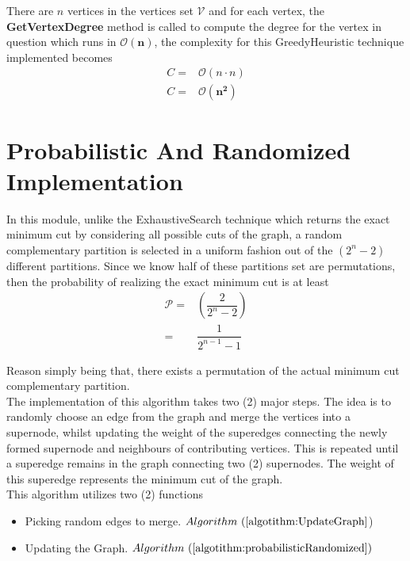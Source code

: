 \documentclass[longpaper, english, final, times]{revdetua}
\begin{document}
			There are $n$ vertices in the vertices set $\mathcal{V}$ and for each vertex, the \textbf{GetVertexDegree} method is called to compute the degree for the vertex in question which runs in $\mathbf{\mathcal{O}(n)}$, the complexity for this GreedyHeuristic technique implemented becomes
			\begin{align*}
				C =& \mathcal{O}(n\cdot n) \\
				C =& \mathbf{\mathcal{O}(n^2)}
			\end{align*}
	
	
	\section{Probabilistic And Randomized Implementation}
		In this module, unlike the ExhaustiveSearch technique which returns the exact minimum cut by considering all possible cuts of the graph, a random complementary partition is selected in a uniform fashion out of the $(2^n-2)$ different partitions. Since we know half of these partitions set are permutations, then the probability of realizing the exact minimum cut is at least 
		\begin{align*}
			\mathcal{P}=&\left(\dfrac{2}{2^n-2}\right) \\
			=&\dfrac{1}{2^{n-1}-1}
		\end{align*}
		 
		Reason simply being that, there exists a permutation of the actual minimum cut complementary partition.\\
		
		The implementation of this algorithm takes two (2) major steps. The idea is to randomly choose an edge from the graph and merge the vertices into a supernode, whilst updating the weight of the superedges connecting the newly formed supernode and neighbours of contributing vertices. This is repeated until a superedge remains in the graph connecting two (2) supernodes. The weight of this superedge represents the minimum cut of the graph.\\
		
		This algorithm utilizes two (2) functions
		\begin{itemize}
			\item Picking random edges to merge. $Algorithm\text{ }(\ref{algotithm:UpdateGraph}$)
			\item Updating the Graph. $Algorithm \text{ }(\ref{algotithm:probabilisticRandomized})$
		\end{itemize}
	
		
\end{document}
